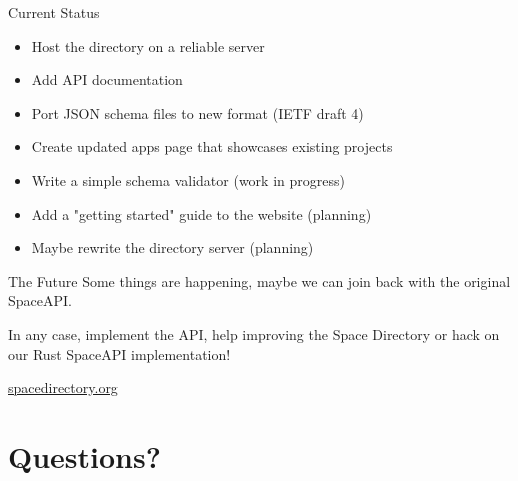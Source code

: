\begin{frame}{Current Status}
	\begin{itemize}
		\item \checkmarkbox Host the directory on a reliable server
			\pause
		\item \checkmarkbox Add API documentation
			\pause
		\item \checkmarkbox Port JSON schema files to new format (IETF draft 4)
			\pause
		\item \checkmarkbox Create updated apps page that showcases existing projects
			\pause
		\item \emptybox Write a simple schema validator (work in progress)
			\pause
		\item \emptybox Add a "getting started" guide to the website (planning)
			\pause
		\item \emptybox Maybe rewrite the directory server (planning)
	\end{itemize}
\end{frame}

\begin{frame}{The Future}
	Some things are happening, maybe we can join back with the original SpaceAPI.

	In any case, implement the API, help improving the Space Directory or hack on
	our Rust SpaceAPI implementation!

	\vspace{4em}

	\centerline{\huge \url{spacedirectory.org}}
\end{frame}

\section{Questions?}

